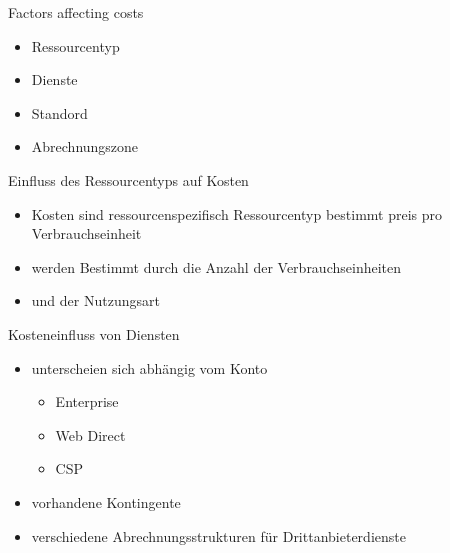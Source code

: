 \begin{flashcard}[Understand]{Factors affecting costs}
    \begin{itemize}
        \item Ressourcentyp
        \item Dienste
        \item Standord
        \item Abrechnungszone
    \end{itemize}

\end{flashcard}

\begin{flashcard}[\ ]{Einfluss des Ressourcentyps auf Kosten}
    \begin{itemize}
        \item Kosten sind ressourcenspezifisch\newline
        Ressourcentyp bestimmt preis pro Verbrauchseinheit
        \item werden Bestimmt durch die Anzahl der Verbrauchseinheiten
        \item und der Nutzungsart
    \end{itemize}

\end{flashcard}

\begin{flashcard}[\ ]{Kosteneinfluss von Diensten}
    \begin{itemize}
        \item unterscheien sich abhängig vom Konto
        \begin{itemize}
            \item Enterprise
            \item Web Direct
            \item CSP
        \end{itemize}
        \item vorhandene Kontingente
        \item verschiedene Abrechnungsstrukturen für Drittanbieterdienste
    \end{itemize}
\end{flashcard}

